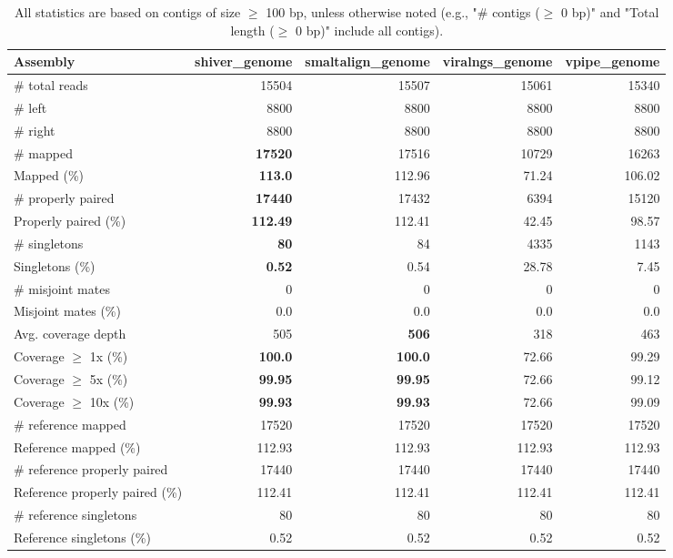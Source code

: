 \documentclass[12pt,a4paper]{article}
\begin{document}
\begin{table}[ht]
\begin{center}
\caption{All statistics are based on contigs of size $\geq$ 100 bp, unless otherwise noted (e.g., "\# contigs ($\geq$ 0 bp)" and "Total length ($\geq$ 0 bp)" include all contigs).}
\begin{tabular}{|l*{4}{|r}|}
\hline
Assembly & shiver\_genome & smaltalign\_genome & viralngs\_genome & vpipe\_genome \\ \hline
\# total reads & 15504 & 15507 & 15061 & 15340 \\ \hline
\# left & 8800 & 8800 & 8800 & 8800 \\ \hline
\# right & 8800 & 8800 & 8800 & 8800 \\ \hline
\# mapped & {\bf 17520} & 17516 & 10729 & 16263 \\ \hline
Mapped (\%) & {\bf 113.0} & 112.96 & 71.24 & 106.02 \\ \hline
\# properly paired & {\bf 17440} & 17432 & 6394 & 15120 \\ \hline
Properly paired (\%) & {\bf 112.49} & 112.41 & 42.45 & 98.57 \\ \hline
\# singletons & {\bf 80} & 84 & 4335 & 1143 \\ \hline
Singletons (\%) & {\bf 0.52} & 0.54 & 28.78 & 7.45 \\ \hline
\# misjoint mates & 0 & 0 & 0 & 0 \\ \hline
Misjoint mates (\%) & 0.0 & 0.0 & 0.0 & 0.0 \\ \hline
Avg. coverage depth & 505 & {\bf 506} & 318 & 463 \\ \hline
Coverage $\geq$ 1x (\%) & {\bf 100.0} & {\bf 100.0} & 72.66 & 99.29 \\ \hline
Coverage $\geq$ 5x (\%) & {\bf 99.95} & {\bf 99.95} & 72.66 & 99.12 \\ \hline
Coverage $\geq$ 10x (\%) & {\bf 99.93} & {\bf 99.93} & 72.66 & 99.09 \\ \hline
\# reference mapped & 17520 & 17520 & 17520 & 17520 \\ \hline
Reference mapped (\%) & 112.93 & 112.93 & 112.93 & 112.93 \\ \hline
\# reference properly paired & 17440 & 17440 & 17440 & 17440 \\ \hline
Reference properly paired (\%) & 112.41 & 112.41 & 112.41 & 112.41 \\ \hline
\# reference singletons & 80 & 80 & 80 & 80 \\ \hline
Reference singletons (\%) & 0.52 & 0.52 & 0.52 & 0.52 \\ \hline

\end{tabular}
\end{center}
\end{table}
\end{document}
